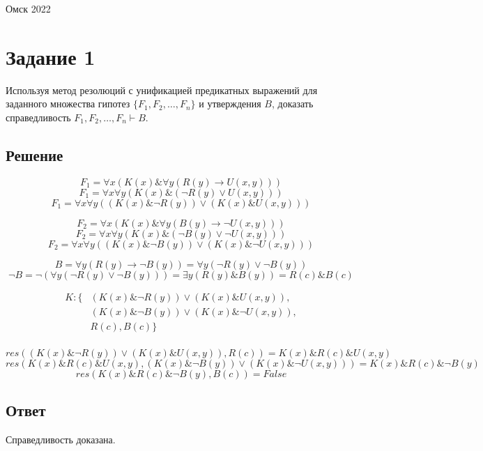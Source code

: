 \documentclass[14pt, a4paper]{article}
\begin{document}
    \vspace*{\fill}
    \begin{center}
        Омск 2022
    \end{center}

    \newpage

    \section*{Задание 1}
    Используя метод резолюций с унификацией предикатных выражений для заданного множества гипотез $\{F_1, F_2, \dots, F_n\}$ и утверждения $B$, доказать справедливость $F_1, F_2, \dots, F_n \vdash B$.

    \subsection*{Решение}

    \[ F_1 = \forall{x}(K(x) \& \forall{y}(R(y) \rightarrow U(x, y))) \]
    \[ F_1 = \forall{x}\forall{y}(K(x) \& (\neg R(y) \vee U(x, y))) \]
    \[ F_1 = \forall{x}\forall{y}((K(x) \& \neg R(y)) \vee (K(x) \& U(x, y))) \]

    \[ F_2 = \forall{x}(K(x) \& \forall{y}(B(y) \rightarrow \neg U(x, y))) \]
    \[ F_2 = \forall{x}\forall{y}(K(x) \& (\neg B(y) \vee \neg U(x, y))) \]
    \[ F_2 = \forall{x}\forall{y}((K(x) \& \neg B(y)) \vee (K(x) \& \neg U(x, y))) \]

    \[ B = \forall{y}(R(y) \rightarrow \neg B(y)) = \forall{y}(\neg R(y) \vee \neg B(y))\]
    \[ \neg B = \neg (\forall{y}(\neg R(y) \vee \neg B(y))) = \exists{y}(R(y) \& B(y)) = R(c) \& B(c) \]

    \begin{align*}
        K: \{
            & (K(x) \& \neg R(y)) \vee (K(x) \& U(x, y)), \\
            & (K(x) \& \neg B(y)) \vee (K(x) \& \neg U(x, y)), \\
            & R(c), B(c) \} \\
    \end{align*}

    \[ res((K(x) \& \neg R(y)) \vee (K(x) \& U(x, y)), R(c)) = K(x) \& R(c) \& U(x, y) \]
    \[ res(K(x) \& R(c) \& U(x, y), (K(x) \& \neg B(y)) \vee (K(x) \& \neg U(x, y))) = K(x) \& R(c) \& \neg B(y) \]
    \[ res(K(x) \& R(c) \& \neg B(y), B(c)) = False\]

    \subsection*{Ответ}
    Справедливость доказана.
\end{document}
